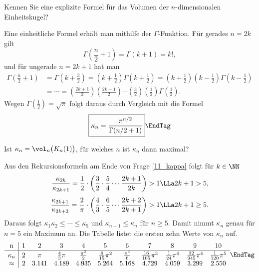 \begin{frage}
  Kennen Sie eine explizite Formel f\"ur das Volumen der 
  $n$-dimensionalen Einheitskugel?
\end{frage}

\begin{antwort}
  Eine einheitliche Formel erh\"alt man mithilfe 
  der $\Gamma$-Funktion. F\"ur gerades $n=2k$ gilt 
  \[
  \Gamma \left( \frac{n}{2}+1 \right) = \Gamma(k+1) = k!, 
  \]
  und f\"ur ungerade $n=2k+1$ hat man
  \begin{align*}
    \Gamma \left(\frac{n}{2} +1 \right) &= \Gamma\left(k+\frac{3}{2}\right) = 
    \left(k+\frac{1}{2}\right)\Gamma\left( k+\frac{1}{2} \right)= 
    \left(k+\frac{1}{2}\right)\left(k-\frac{1}{2}\right)\Gamma\left( k-\frac{1}{2} \right)\\
    &= \cdots 
    = \left( \frac{2k+1}{2} \right)\left( \frac{2k-1}{2} \right) \cdots 
    \left( \frac{3}{2} \right) 
    \left( \frac{1}{2} \right) \Gamma\left(\frac{1}{2}\right).
  \end{align*}
  Wegen $\Gamma(\frac{1}{2})=\sqrt{\pi}$ folgt 
  daraus durch Vergleich mit {\astref} die Formel
  \[
  \boxed{
    \kappa_n = \frac{\pi^{n/2}}{\Gamma( n/2 +1 )} 
  }  \EndTag
  \]
\end{antwort}

\begin{frage}
  Ist $\kappa_n=\vol_n \big( K_n(1) \big)$, f\"ur welches $n$ 
  ist $\kappa_n$ dann maximal?
\end{frage}

\begin{antwort}
  Aus den Rekursionsformeln am Ende von Frage \ref{11_kappa} folgt 
  für $k\in \NN$  
  \begin{align*}
    \frac{\kappa_{2k}}{\kappa_{2k+1}} = 
    \frac{1}{2} \cdot \left( 
      \frac{3}{2}\cdot \frac{5}{4} \cdots \frac{2k+1}{2k} \right) > 1 
    &\LLa  2k+1 > 5, \\[1mm]
    \frac{\kappa_{2k+1}}{\kappa_{2k+2}} = 
    \frac{2}{\pi} \cdot \left(  
      \frac{4}{3}\cdot \frac{6}{5} \cdots \frac{2k+2}{2k+1} \right) > 1 
    &\LLa  2k+1 \ge 5.
  \end{align*}
  Daraus folgt $\kappa_1  \kappa_2 \le \cdots \le \kappa_5$ 
  und $\kappa_{n+1}\le \kappa_n$ für $n\ge 5$. Damit nimmt 
  $\kappa_n$ genau f\"ur $n=5$ ein Maximum an.  
  Die Tabelle listet die ersten zehn Werte von $\kappa_n$ auf. 
  \[ 
  \begin{array}{c|cccccccccc}
    $n$ & 1 & 2 & 3 & 4 & 5 & 6 & 7 & 8 & 9 & 10\\ \hline
    \kappa_n & 2 & \pi & \frac{4}{3}\pi & \frac{\pi^2}{2} & 
    \frac{8}{15}\pi^2 & \frac{\pi^3}{6} & \frac{16}{105}\pi^3 & 
    \frac{1}{24}\pi^4 & 
    \frac{32}{945}\pi^4 & 
    \frac{1}{120}\pi^5
    \\ \approx &
    2 & 3.141 & 4.189 & 4.935 & 5.264 & 5.168 & 4.729 & 4.059 
    & 3.299 & 2.550 
  \end{array}
  \EndTag
  \]
\end{antwort}

